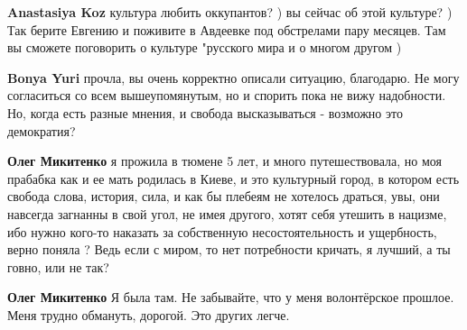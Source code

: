 \begin{itemize}
\begin{itemize}
 
\textbf{Anastasiya Koz} культура любить оккупантов? ) вы сейчас об этой культуре? ) Так берите Евгению и поживите в Авдеевке под обстрелами пару месяцев. Там вы сможете поговорить о культуре "русского мира и о многом другом )

 
\textbf{Bonya Yuri} прочла, вы очень корректно описали ситуацию, благодарю. Не могу согласиться со всем вышеупомянутым, но и спорить пока не вижу надобности. Но, когда есть разные мнения, и свобода высказываться - возможно это демократия?

 
\textbf{Олег Микитенко} я прожила в тюмене 5 лет, и много путешествовала, но моя прабабка как и ее мать родилась в Киеве, и это культурный город, в котором есть свобода слова, история, сила, и как бы плебеям не хотелось драться, увы, они навсегда загнанны в свой угол, не имея другого, хотят себя утешить в нацизме, ибо нужно кого-то наказать за собственную несостоятельность и ущербность, верно поняла ? Ведь если с миром, то нет потребности кричать, я лучший, а ты говно, или не так?

 
\textbf{Олег Микитенко} Я была там. Не забывайте, что у меня волонтёрское прошлое. Меня трудно обмануть, дорогой. Это других легче.

 

\end{itemize}
\end{itemize}
